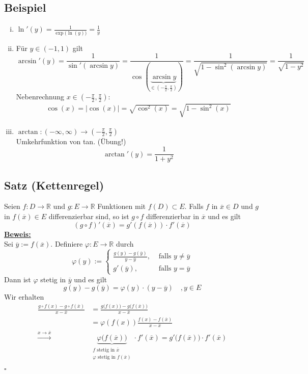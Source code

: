 \subsection{Beispiel} %
\label{sub:beispiel}
\begin{enumerate}[(i)]
	\item $\ln' (y) = \frac{1}{\exp \big(\ln(y) \big) } = \frac{1}{y}  $
	\item Für $y \in (-1,1)$ gilt
	\[
		\arcsin'(y) = \frac{1}{\sin' ( \arcsin y)}  = \frac{1}{\cos ( \underbrace{\arcsin y}_{\in ( - \frac{\pi}{2}, \frac{\pi}{2})})} 
		= \frac{1}{\sqrt{1- \sin ^2 ( \arcsin y)} } = \frac{1}{\sqrt{1- y^2} }  
	\]
	Nebenrechnung $ x \in \left( - \frac{\pi}{2} , \frac{\pi}{2} \right)$:
	\begin{align*}
		\cos (x) = | \cos (x) | 
		= \sqrt{\cos^2 (x)} = \sqrt{1 - \sin^2 (x)}  
	\end{align*}
	\item $\arctan : (- \infty, \infty) \to ( - \frac{\pi}{2}, \frac{\pi}{2})$ \\
	Umkehrfunktion von tan. (Übung!)
	\[
		\arctan' (y) = \frac{1}{1+ y^2} 
	\]
\end{enumerate}

\subsection{Satz (Kettenregel)} %
\label{sub:satz_kettenregel_}
Seien $f : D \to \mathds{R}$ und $g : E \to \mathds{R}$ Funktionen mit $f(D) \subset E$. Falls $f$ in $\overline{x} \in D$ und $g$ in $f (\overline{x}) \in E$
differenzierbar sind, so ist $g \circ f$ differenzierbar in $\overline{x}$ und es gilt
\[
	(g \circ f)' (\overline{x}) = g' \left( f (\overline{x})\right) \cdot f' (\overline{x})
\]
\underline{\textbf{Beweis:}} \\
Sei $\overline{y}  := f(\overline{x} )$. Definiere $\varphi : E \to \mathds{R}$ durch
\[
	\varphi (y) := \begin{cases}
		\frac{g(y) - g(\overline{y})}{y- \overline{y} } , &\text{ falls }y \not= \overline{y} \\
		g'(\overline{y}) , &\text{ falls } y= \overline{y}  
	\end{cases}
\]
Dann ist $\varphi$ stetig in $\overline{y}$ und es gilt
\[
	g(y)- g(\overline{y} ) = \varphi (y) \cdot (y- \overline{y}) \quad , y \in E
\]
Wir erhalten
\begin{align*}
	\frac{g \circ f (x) - g \circ f (\overline{x} )}{x - \overline{x} } &= \frac{g \big( f(x) \big) - g \big( f(\overline{x}) \big)}{x - \overline{x}} \\
	&= \varphi ( f(x)) \frac{f(x) - f(\overline{x})}{x- \overline{x} }   \\
	\xrightarrow{x \to \overline{x}} & \underbrace{\varphi \big(f(\overline{x}) \big)}_{\substack{f \text{ stetig in } \overline{x} 
	\\ \varphi \text{ stetig in } f(\overline{x} )}}  \cdot f'(\overline{x})
	= g' \big( f(\overline{x})\big) \cdot f '(\overline{x})
\end{align*}
\hfill \( \square \)

